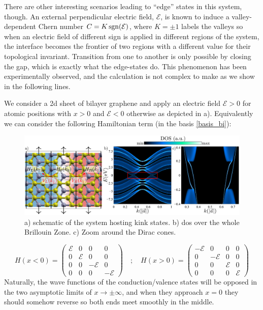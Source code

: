 There are other interesting scenarios leading to ``edge'' states in this system, though.
An external perpendicular electric field, $\mathcal{E}$, is known to induce a valley-dependent Chern number $C=K\operatorname{sgn}({\mathcal{E}})$, where $K=\pm1$ labels the valleys\cite{Martin2008,San-Jose2009} so when an electric field of different sign is applied in different regions of the system\cite{Martin2008,Jung2011,Yin2016,Li2016,Li2018b}, the interface becomes the frontier of two regions with a different value for their topological invariant. Transition from one to another is only possible by closing the gap, which is exactly what the edge-states do.
This phenomenon has been experimentally observed\cite{Li2016}, and the calculation is not complex to make as we show in the following lines.

We consider a \ac{2d} sheet of bilayer graphene and apply an electric field $\mathcal{E}>0$ for atomic positions with $x>0$ and $\mathcal{E}<0$ otherwise as depicted in a). Equivalently we can consider the following Hamiltonian term (in the basis \eqref{basis_bi}):
\begin{figure}[h!]
\centering
\includegraphics{graphene_bilayer/figures/kink_states.pdf}
\vspace{-5pt}
\caption{a) schematic of the system hosting kink states. b) \ac{dos} over the whole Brillouin Zone. c) Zoom around the Dirac cones.}
\label{fig:kink_states}
\end{figure}
\begin{equation}
   H(x<0) = \left(\begin{array}{cccc}
   \mathcal{E} & 0 & 0 & 0 \\
   0 & \mathcal{E} & 0 & 0 \\
   0 & 0 & -\mathcal{E} & 0 \\
   0 & 0 & 0 & -\mathcal{E}
   \end{array}\right) \quad;\quad
   H(x>0) = \left(\begin{array}{cccc}
   -\mathcal{E} & 0 & 0 & 0 \\
   0 & -\mathcal{E} & 0 & 0 \\
   0 & 0 & \mathcal{E} & 0 \\
   0 & 0 & 0 & \mathcal{E}
   \end{array}\right)
\end{equation}
Naturally, the wave functions of the conduction/valence states will be opposed in the two asymptotic limits of $x\to\pm\infty$, and when they approach $x=0$ they should somehow reverse so both ends meet smoothly in the middle.

